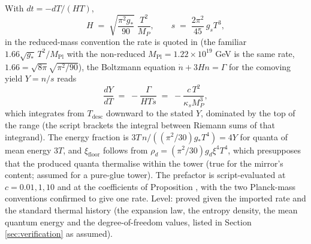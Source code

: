 With $dt = -dT/(HT)$,
\[
H \;=\; \sqrt{\frac{\pi^{2}g_{*}}{90}}\;\frac{T^{2}}{M_{P}}, \qquad s \;=\; \frac{2\pi^{2}}{45}\,g_{s}T^{3},
\]
in the reduced-mass convention the rate is quoted in (the familiar $1.66\sqrt{g_{*}}\,T^{2}/M_{\mathrm{Pl}}$ with the non-reduced $M_{\mathrm{Pl}} = 1.22 \times 10^{19}$ GeV is the same rate, $1.66 = \sqrt{8\pi}\sqrt{\pi^{2}/90}$), the Boltzmann equation $\dot{n} + 3Hn = \Gamma$ for the comoving yield $Y = n/s$ reads
\[
\frac{dY}{dT} \;=\; -\frac{\Gamma}{HTs} \;=\; -\frac{c\,T^{2}}{\kappa_{s}M_{P}^{3}},
\]
which integrates from $T_{\mathrm{desc}}$ downward to the stated $Y$, dominated by the top of the range (the script brackets the integral between Riemann sums of that integrand). The energy fraction is $3T\,n/((\pi^{2}/30)g_{*}T^{4}) = 4Y$ for quanta of mean energy $3T$, and $\xi_{\mathrm{floor}}$ follows from $\rho_{d} = (\pi^{2}/30)g_{d}\xi^{4}T^{4}$, which presupposes that the produced quanta thermalise within the tower (true for the mirror's content; assumed for a pure-glue tower). The prefactor is script-evaluated at $c = 0.01, 1, 10$ and at the coefficients of Proposition , with the two Planck-mass conventions confirmed to give one rate. Level: proved given the imported rate and the standard thermal history (the expansion law, the entropy density, the mean quantum energy and the degree-of-freedom values, listed in Section \ref{sec:verification} as assumed).
